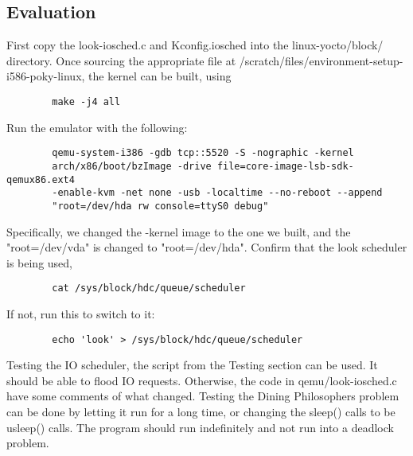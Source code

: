\documentclass[letterpaper,10pt]{article}
\begin{document}
	\subsection{Evaluation}
	First copy the look-iosched.c and Kconfig.iosched into the linux-yocto/block/ directory. Once sourcing the appropriate file at /scratch/files/environment-setup-i586-poky-linux, the kernel can be built, using 
	\begin{verbatim}
		make -j4 all
	\end{verbatim}
	Run the emulator with the following:
	\begin{lstlisting}
		qemu-system-i386 -gdb tcp::5520 -S -nographic -kernel 
		arch/x86/boot/bzImage -drive file=core-image-lsb-sdk-qemux86.ext4 
		-enable-kvm -net none -usb -localtime --no-reboot --append 
		"root=/dev/hda rw console=ttyS0 debug"
	\end{lstlisting}
	Specifically, we changed the -kernel image to the one we built, and the "root=/dev/vda" is changed to "root=/dev/hda".
	Confirm that the look scheduler is being used, 
	\begin{verbatim}
		cat /sys/block/hdc/queue/scheduler
	\end{verbatim}
	If not, run this to switch to it:
	\begin{verbatim}
		echo 'look' > /sys/block/hdc/queue/scheduler
	\end{verbatim}
	Testing the  IO scheduler, the script from the Testing section can be used. It should be able to flood IO requests. Otherwise, the code in qemu/look-iosched.c have some comments of what changed.
	Testing the Dining Philosophers problem can be done by letting it run for a long time, or changing the sleep() calls to be usleep() calls. The program should run indefinitely and not run into a deadlock problem.
	
	
	
\end{document}
